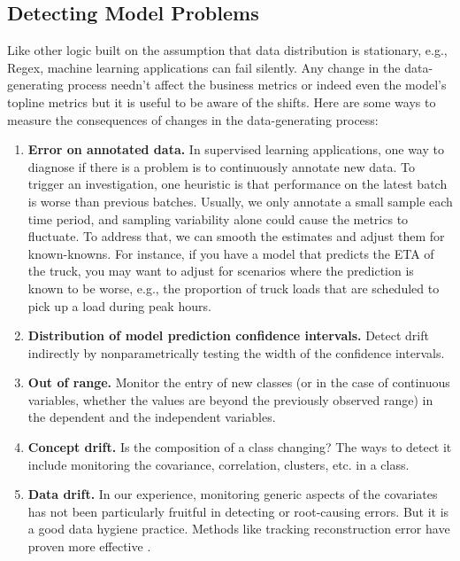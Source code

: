 \documentclass[12pt, letterpaper]{article}
\begin{document}
\subsection{Detecting Model Problems}
Like other logic built on the assumption that data distribution is stationary, e.g., Regex, machine learning applications can fail silently. Any change in the data-generating process needn't affect the business metrics or indeed even the model's topline metrics but it is useful to be aware of the shifts. Here are some ways to measure the consequences of changes in the data-generating process: 
\begin{enumerate}

    \item \textbf{Error on annotated data.} In supervised learning applications, one way to diagnose if there is a problem is to continuously annotate new data. To trigger an investigation, one heuristic is that performance on the latest batch is worse than previous batches. Usually, we only annotate a small sample each time period, and sampling variability alone could cause the metrics to fluctuate. To address that, we can smooth the estimates and adjust them for known-knowns. For instance, if you have a model that predicts the ETA of the truck, you may want to adjust for scenarios where the prediction is known to be worse, e.g., the proportion of truck loads that are scheduled to pick up a load during peak hours.
    
    \item \textbf{Distribution of model prediction confidence intervals.} Detect drift indirectly by nonparametrically testing the width of the confidence intervals.
    
    \item \textbf{Out of range.} Monitor the entry of new classes (or in the case of continuous variables, whether the values are beyond the previously observed range) in the dependent and the independent variables. 
    
    \item \textbf{Concept drift.} Is the composition of a class changing? The ways to detect it include monitoring the covariance, correlation, clusters, etc. in a class.
    
    \item \textbf{Data drift.} In our experience, monitoring generic aspects of the covariates has not been particularly fruitful in detecting or root-causing errors. But it is a good data hygiene practice. Methods like tracking reconstruction error have proven more effective \citep{zavrtanik2021reconstruction}.

\end{enumerate}
\end{document}
